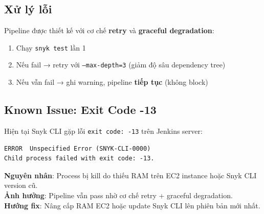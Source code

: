 \subsection{Xử lý lỗi}
Pipeline được thiết kế với cơ chế \textbf{retry} và \textbf{graceful degradation}:
\begin{enumerate}[noitemsep]
    \item Chạy \texttt{snyk test} lần 1
    \item Nếu fail → retry với \texttt{--max-depth=3} (giảm độ sâu dependency tree)
    \item Nếu vẫn fail → ghi warning, pipeline \textbf{tiếp tục} (không block)
\end{enumerate}

\subsection{Known Issue: Exit Code -13}
Hiện tại Snyk CLI gặp lỗi \texttt{exit code: -13} trên Jenkins server:
\begin{lstlisting}[caption={Snyk error output}]
ERROR  Unspecified Error (SNYK-CLI-0000)
Child process failed with exit code: -13.
\end{lstlisting}

\textbf{Nguyên nhân}: Process bị kill do thiếu RAM trên EC2 instance hoặc Snyk CLI version cũ.\\
\textbf{Ảnh hưởng}: Pipeline vẫn pass nhờ cơ chế retry + graceful degradation.\\
\textbf{Hướng fix}: Nâng cấp RAM EC2 hoặc update Snyk CLI lên phiên bản mới nhất.

